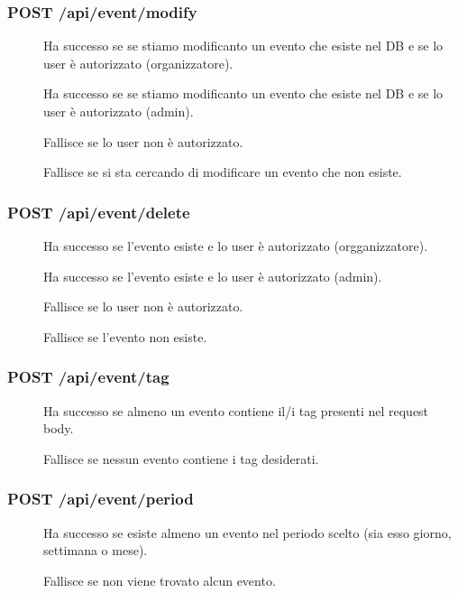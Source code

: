 \documentclass{article}
\begin{document}
\subsubsection{POST /api/event/modify}
\begin{description}
    \item[] Ha successo se se stiamo modificanto un evento che esiste nel DB e se lo user è autorizzato (organizzatore).
    \item[] Ha successo se se stiamo modificanto un evento che esiste nel DB e se lo user è autorizzato (admin).
    \item[] Fallisce se lo user non è autorizzato.
    \item[] Fallisce se si sta cercando di modificare un evento che non esiste.
\end{description}
\subsubsection{POST /api/event/delete}
\begin{description}
    \item[] Ha successo se l'evento esiste e lo user è autorizzato (orgganizzatore).
    \item[] Ha successo se l'evento esiste e lo user è autorizzato (admin).
    \item[] Fallisce se lo user non è autorizzato.
    \item[] Fallisce se l'evento non esiste.
\end{description}
\subsubsection{POST /api/event/tag}
\begin{description}
    \item[] Ha successo se almeno un evento contiene il/i tag presenti nel request body.
    \item[] Fallisce se nessun evento contiene i tag desiderati.
\end{description}
\subsubsection{POST /api/event/period}
\begin{description}
    \item[] Ha successo se esiste almeno un evento nel periodo scelto (sia esso giorno, settimana o mese).
    \item[] Fallisce se non viene trovato alcun evento.
\end{description}
\end{document}
